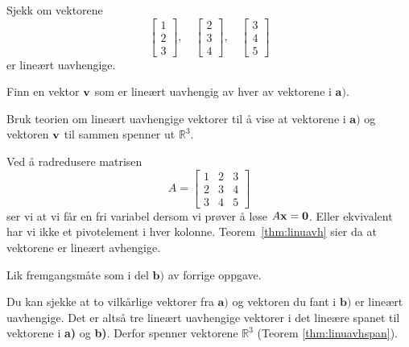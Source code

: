 \begin{oppgave}
\begin{punkt}
Sjekk om vektorene $$
\begin{bmatrix}
1\\
2\\
3
\end{bmatrix}, \quad \begin{bmatrix}
2\\
3\\
4
\end{bmatrix}, \quad \begin{bmatrix}
3\\
4\\
5
\end{bmatrix}
$$
er lineært uavhengige.
\end{punkt}

\begin{punkt}
Finn en vektor $\mathbf{v}$ som er lineært uavhengig av hver av vektorene i
$\textbf{a)}$.
\end{punkt}

\begin{punkt}
Bruk teorien om lineært uavhengige vektorer til å vise at vektorene i $\textbf{a)}$ og vektoren $\mathbf{v}$ til sammen spenner ut $\mathbb{R}^3$.
\end{punkt}
\end{oppgave}

\begin{losning}

\begin{punkt}
Ved å radredusere matrisen $$A=\begin{bmatrix}
1 & 2 & 3\\
2 & 3 & 4\\
3 & 4 & 5
\end{bmatrix}$$ ser vi at vi får en fri variabel dersom vi prøver å løse $A\mathbf{x}=\mathbf{0}$. Eller ekvivalent har vi ikke et pivotelement i hver kolonne. Teorem~\ref{thm:linuavh} sier da at vektorene er lineært avhengige.
\end{punkt}

\begin{punkt}
Lik fremgangsmåte som i del $\textbf{b)}$ av forrige oppgave.
\end{punkt}


\begin{punkt}
Du kan sjekke at to vilkårlige vektorer fra $\textbf{a)}$ og vektoren du fant i $\textbf{b)}$ er lineært uavhengige. Det er altså tre lineært uavhengige vektorer i det lineære spanet til vektorene i \textbf{a)} og \textbf{b)}. Derfor spenner vektorene $\mathbb{R}^3$ (Teorem \ref{thm:linuavhspan}).
\end{punkt}

\end{losning}









